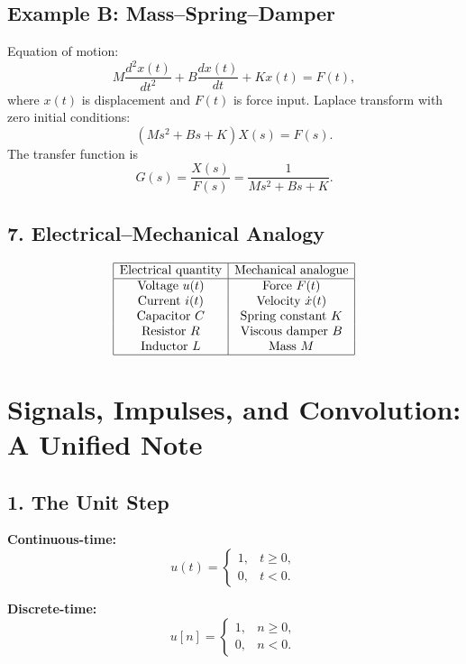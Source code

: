 \documentclass[12pt,a4paper]{article}
\begin{document}
	\subsection*{Example B: Mass–Spring–Damper}
	Equation of motion:
	$$
	M \frac{d^2 x(t)}{dt^2} + B \frac{dx(t)}{dt} + Kx(t) = F(t),
	$$
	where $x(t)$ is displacement and $F(t)$ is force input.  
	Laplace transform with zero initial conditions:
	$$
	(Ms^2 + Bs + K) X(s) = F(s).
	$$
	The transfer function is
	$$
	G(s) = \frac{X(s)}{F(s)} = \frac{1}{Ms^2 + Bs + K}.
	$$
	
	\subsection*{7. Electrical–Mechanical Analogy}
	\[
	\begin{array}{|c|c|}
		\hline
		\text{Electrical quantity} & \text{Mechanical analogue} \\
		\hline
		\text{Voltage } u(t) & \text{Force } F(t) \\
		\text{Current } i(t) & \text{Velocity } \dot{x}(t) \\
		\text{Capacitor } C & \text{Spring constant } K \\
		\text{Resistor } R & \text{Viscous damper } B \\
		\text{Inductor } L & \text{Mass } M \\
		\hline
	\end{array}
	\]
	
	
			
		\section*{Signals, Impulses, and Convolution: A Unified Note}
		
		\subsection*{1. The Unit Step}
		
		\textbf{Continuous-time:}
		$$
		u(t) =
		\begin{cases}
			1, & t \geq 0, \\
			0, & t < 0.
		\end{cases}
		$$
		
		\textbf{Discrete-time:}
		$$
		u[n] =
		\begin{cases}
			1, & n \geq 0, \\
			0, & n < 0.
		\end{cases}
		$$
		
\end{document}
